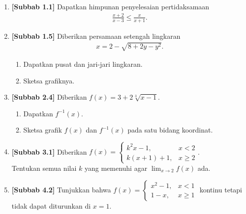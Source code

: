 \documentclass[10pt,openany,a4paper]{article}
\theoremstyle{definition}
\theoremstyle{definition}
\theoremstyle{plain}
\begin{document}
\newpage

\begin{enumerate}
    \item \textbf{[Subbab 1.1]} Dapatkan himpunan penyelesaian pertidaksamaan
    \begin{align*}
        \frac{x+2}{x-3}\leq\frac{x}{x+1}.
    \end{align*}

    \item \textbf{[Subbab 1.5]} Diberikan persamaan setengah lingkaran
    \begin{align*}
        x=2-\sqrt{8+2y-y^2}.
    \end{align*}
    \begin{enumerate}
        \item Dapatkan pusat dan jari-jari lingkaran.
        \item Sketsa grafiknya.
    \end{enumerate}

    \item \textbf{[Subbab 2.4]} Diberikan $f(x)=3+2\sqrt[3]{x-1}$.
    \begin{enumerate}
        \item Dapatkan $f^{-1}(x)$.
        \item Sketsa grafik $f(x)$ dan $f^{-1}(x)$ pada satu bidang koordinat.
    \end{enumerate}

    \item \textbf{[Subbab 3.1]} Diberikan $f(x)=\begin{cases}
        k^2x-1, & x<2\\
        k(x+1)+1, & x\geq 2
    \end{cases}$.\\
    Tentukan semua nilai $k$ yang memenuhi agar $\displaystyle\lim_{x\to 2}f(x)$ ada.

    \item \textbf{[Subbab 4.2]} Tunjukkan bahwa $f(x)=\begin{cases}
        x^2-1, & x<1\\
        1-x, & x\geq 1
    \end{cases}$ kontinu tetapi tidak dapat diturunkan di $x=1$.
\end{enumerate}
\end{document}
